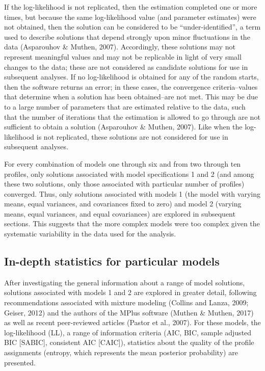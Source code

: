 \documentclass[]{book}
\theoremstyle{definition}
\theoremstyle{definition}
\theoremstyle{definition}
\theoremstyle{remark}
\begin{document}
If the log-likelihood is not replicated, then the estimation completed
one or more times, but because the same log-likelihood value (and
parameter estimates) were not obtained, then the solution can be
considered to be ``under-identified'', a term used to describe solutions
that depend strongly upon minor fluctuations in the data (Asparouhov \&
Muthen, 2007). Accordingly, these solutions may not represent meaningful
values and may not be replicable in light of very small changes to the
data; these are not considered as candidate solutions for use in
subsequent analyses. If no log-likelihood is obtained for any of the
random starts, then the software returns an error; in these cases, the
convergence criteria--values that determine when a solution has been
obtained--are not met. This may be due to a large number of parameters
that are estimated relative to the data, such that the number of
iterations that the estimation is allowed to go through are not
sufficient to obtain a solution (Asparouhov \& Muthen, 2007). Like when
the log-likelihood is not replicated, these solutions are not considered
for use in subsequent analyses.

For every combination of models one through six and from two through ten
profiles, only solutions associated with model specifications 1 and 2
(and among these two solutions, only those associated with particular
number of profiles) converged. Thus, only solutions associated with
models 1 (the model with varying means, equal variances, and covariances
fixed to zero) and model 2 (varying means, equal variances, and equal
covariances) are explored in subsequent sections. This suggests that the
more complex models were too complex given the systematic variability in
the data used for the analysis.

\subsection{In-depth statistics for particular
models}\label{in-depth-statistics-for-particular-models}

After investigating the general information about a range of model
solutions, solutions associated with models 1 and 2 are explored in
greater detail, following recommendations associated with mixture
modeling (Collins and Lanza, 2009; Geiser, 2012) and the authors of the
MPlus software (Muthen \& Muthen, 2017) as well as recent peer-reviewed
articles (Pastor et al., 2007). For these models, the log-likelihood
(LL), a range of information criteria (AIC, BIC, sample adjusted BIC
{[}SABIC{]}, consistent AIC {[}CAIC{]}), statistics about the quality of
the profile assignments (entropy, which represents the mean posterior
probability) are presented.
\end{document}
